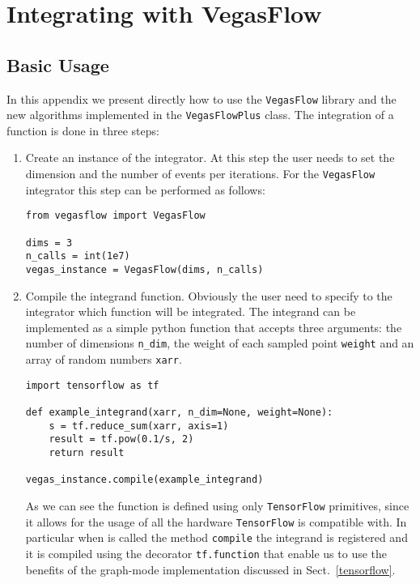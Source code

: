 \documentclass[../main/main.tex]{subfiles}
\begin{document}
\chapter{Integrating with VegasFlow}

\section{Basic Usage}
In this appendix we present directly how to use the \texttt{VegasFlow} library and the new algorithms implemented in the \texttt{VegasFlowPlus} class. The integration of a function is done in three steps:
\begin{enumerate}
	\item Create an instance of the integrator. At this step the user needs to set the dimension and the number of events per iterations. For the \texttt{VegasFlow} integrator this step can be performed as follows:
	\begin{verbatim}
from vegasflow import VegasFlow
		
dims = 3
n_calls = int(1e7)
vegas_instance = VegasFlow(dims, n_calls)
\end{verbatim}
\item Compile the integrand function. Obviously the user need to specify to the integrator which function will be integrated. The integrand can be implemented as a simple python function that accepts three arguments: the number of dimensions \texttt{n\_dim}, the weight of each sampled point \texttt{weight} and an array of random numbers \texttt{xarr}.
\begin{verbatim}
import tensorflow as tf
	
def example_integrand(xarr, n_dim=None, weight=None):
	s = tf.reduce_sum(xarr, axis=1)
	result = tf.pow(0.1/s, 2)
	return result

vegas_instance.compile(example_integrand)
\end{verbatim}

As we can see the function is defined using only \texttt{TensorFlow} primitives, since it allows for the usage of all the hardware \texttt{TensorFlow} is compatible with. In particular when is called the method \texttt{compile} the integrand is registered and it is compiled using the decorator \texttt{tf.function} that enable us to use the benefits of the graph-mode implementation discussed in Sect.~\ref{tensorflow}.


\end{enumerate}
\end{document}
